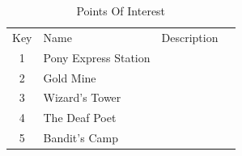 
\begin{table}
	\small
	\centering
	\caption{Points Of Interest}
	\begin{tabularx}{\textwidth}{
			c
			>{\raggedleft}X
			p{\columnwidth}
			>{\raggedright\arraybackslash}X}
		\toprule
		Key & Name                 & Description \\
		1   & Pony Express Station &             \\
		2   & Gold Mine            &             \\
		3   & Wizard's Tower       &             \\
		4   & The Deaf Poet        &             \\
		5   & Bandit's Camp        &             \\
		\bottomrule
	\end{tabularx}
\end{table}
